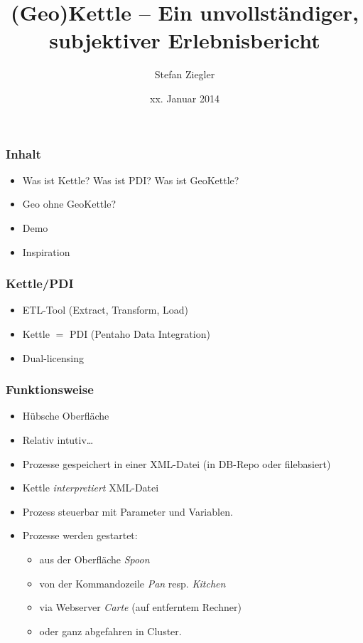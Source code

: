 \documentclass{beamer}
\title{(Geo)Kettle -- Ein unvollständiger, subjektiver Erlebnisbericht}
\author[Stefan Ziegler]%
{Stefan Ziegler}%
\institute[Amt für Geoinformation]{%
Amt für Geoinformation \\
Rötistrasse 4\\
4500 Solothurn}
\date[xx.01.13]{xx. Januar 2014}
\begin{document}
\begin{frame}
  \titlepage
\end{frame}

\begin{frame}
  \frametitle{Inhalt}
  \begin{itemize}
  \item Was ist Kettle? Was ist PDI? Was ist GeoKettle?
  \item Geo ohne GeoKettle?
  \item Demo
  \item Inspiration
  \end{itemize}
\end{frame}

\begin{frame}
  \frametitle{Kettle/PDI}
  \begin{itemize}
  \item ETL-Tool (Extract, Transform, Load)
  \item Kettle $=$ PDI (Pentaho Data Integration) 
  \item Dual-licensing
  \end{itemize}
\end{frame}

\begin{frame}
  \frametitle{Funktionsweise}
  \begin{itemize}
  \item Hübsche Oberfläche
  \item Relativ intutiv\ldots{}
  \item Prozesse gespeichert in einer XML-Datei (in DB-Repo oder filebasiert)
  \item Kettle \textsl{interpretiert} XML-Datei
  \item Prozess steuerbar mit Parameter und Variablen.
  \item Prozesse werden gestartet:
	  \begin{itemize}
	  \item aus der Oberfläche \textsl{Spoon}
	  \item von der Kommandozeile \textsl{Pan} resp. \textsl{Kitchen}
	  \item via Webserver \textsl{Carte} (auf entferntem Rechner)
	  \item oder ganz abgefahren in Cluster.
	  \end{itemize}
  \end{itemize}
\end{frame}
\end{document}
